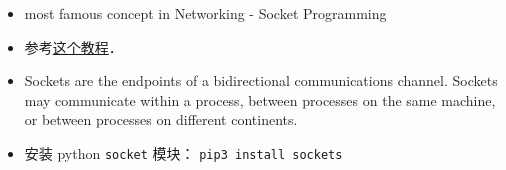 
\begin{itemize}
\item most famous concept in Networking - Socket Programming
\item 参考\href{https://www.tutorialspoint.com/python/python_networking.htm}{这个教程}．
\item Sockets are the endpoints of a bidirectional communications channel. Sockets may communicate within a process, between processes on the same machine, or between processes on different continents.
\item 安装 python \verb|socket| 模块： \verb|pip3 install sockets|
\end{itemize}
